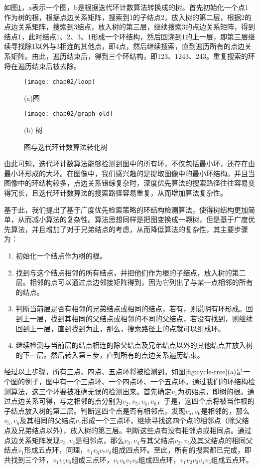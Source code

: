 如图\ref{fig:graph-tree}，a表示一个图，b是根据迭代环计数算法转换成的树。首先初始化一个点1作为树的根，根据点边关系矩阵，搜索到1的子结点2，放入树的第二层，根据2的点边关系矩阵，搜索到3结点，放入树的第三层，继续搜索3的点边关系矩阵，得到结点1，此时结点1、2、3、1形成一个环结构，然后回溯到1的上一层，即第三层继续寻找除1以外与3相连的其他点，即4点，然后继续搜索，直到遍历所有的点边关系矩阵。由此，遍历结束后，得到三个环结构，即123、1243、243。重复搜索的环将在遍历结束后被去除。
\begin{figure}[H]
\centering
  \begin{minipage}[b]{0.48\textwidth} 
      \centering 
      \texttt{[image: chap02/loop]}
        \centerline{(a)图}\medskip
    \end{minipage}
  \begin{minipage}[b]{0.48\textwidth}
    \centering
    \texttt{[image: chap02/graph-old]}
      \centerline{(b) 树}\medskip
  \end{minipage}
\caption{图与迭代环计数算法转化树}
\label{fig:graph-tree}
\end{figure}

由此可知，迭代环计数算法能够检测到图中的所有环，不仅包括最小环，还存在由最小环形成的大环。在图像中，我们感兴趣的是提取图像中的最小环结构。并且当图像中的环结构较多，点边关系错综复杂时，深度优先算法的搜索路径往往容易变得冗长，且迭代环计数算法的搜索路径容易重复，从而增加算法复杂性。

基于此，我们提出了基于广度优先检索策略的环结构检测算法，使得树结构更加简单，从而减小算法的复杂性。算法思想同样是把图变换成一颗树，但是基于广度优先算法，并且增加了对于兄弟结点的考虑，从而降低算法的复杂性，其主要步骤为：
\begin{enumerate}
\item 初始化一个结点作为树的根。
\item 找到与这个结点相邻的所有结点，并把他们作为根的子结点，放入树的第二层。相邻的点可以通过点边邻接矩阵得到，因为它列出了与某一点相邻的所有的结点。
\item 判断当前层是否有相邻的兄弟结点或相同的结点，若有，则说明有环形成。回到上一层，找到其相同的父结点或相邻的不同的父结点，若没有找到，则继续回到上一层，直到找到为止，那么，搜索路径上的点就可以组成环。
\item 继续检测与当前层的结点相连的除父结点及兄弟结点以外的其他结点并放入树的下一层。然后转入第三步，直到所有的点边关系遍历结束。
\end{enumerate}
经过以上步骤，所有三点、四点、五点环将被检测到。如图\ref{fig:cycle-tree}(a)是一个图的例子，图中有一个三点环、一个四点环、一个五点环。通过我们的环结构检测算法，这三个环要被准确无误的检测出来。首先确定$v_1$为初始点，即树的根。通过点边关系可得，与之相邻的点分别为$v_2, v_5, v_6, v_8$，于是，这四个点将被当作根的子结点放入树的第二层。判断这四个点是否有相邻点，发现$v_5, v_6$是相邻的，那么$v_5, v_6$及其相同的父结点$v_1$形成一个三点环，继续寻找这四个点的相邻点（除父结点及兄弟结点以外），放入树的第三层。判断这些点有没有相邻点或相同点。通过点边关系矩阵发现$v_3,v_4$是相邻点，那么$v_3,v_4$与其父结点$v_2,v_5$及其父结点的相同父结点$v_1$形成五点环，同理，$v_{1}v_{6}v_{7}v_{8}$组成四点环。至此，所有的搜索都已完成，即共找到三个环，$v_{1}v_{5}v_{6}$组成三点环，$v_{1}v_{6}v_{7}v_{8}$组成四点环，$v_{1}v_{2}v_{3}v_{4}v_{5}$组成五点环。


